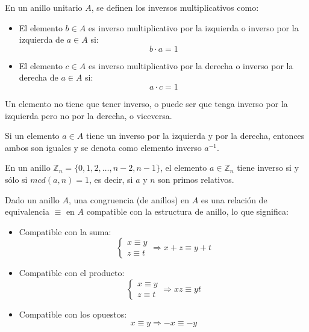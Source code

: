 \begin{definition}
En un anillo unitario $A$, se definen los inversos multiplicativos como:
\begin{itemize}
    \item El elemento $b \in A$ es inverso multiplicativo por la izquierda o inverso por la izquierda de $a \in A$ si:
    $$b \cdot a = 1$$
    \item El elemento $c \in A$ es inverso multiplicativo por la derecha o inverso por la derecha de $a \in A$ si:
    $$a \cdot c = 1$$
\end{itemize}

Un elemento no tiene que tener inverso, o puede ser que tenga inverso por la izquierda pero no por la derecha, o viceversa.

Si un elemento $a \in A$ tiene un inverso por la izquierda y por la derecha, entonces ambos son iguales y se denota como elemento inverso $a^{-1}$.

En un anillo $\mathbb{Z}_{n} = \{0, 1, 2, \dots, n-2, n-1\}$, el elemento $a \in \mathbb{Z}_{n}$ tiene inverso si y sólo si $mcd(a, n) = 1$, es decir, si $a$ y $n$ son primos relativos.
\end{definition}

\begin{definition}[Congruencia]
    Dado un anillo $A$, una congruencia (de anillos) en $A$ es una relación de equivalencia $\equiv$ en $A$ compatible con la estructura de anillo, lo que significa:
    \begin{itemize}
        \item Compatible con la suma:
        \begin{equation*}
            \begin{cases}
            x \equiv y \\
            z \equiv t
            \end{cases}
            \Rightarrow x + z \equiv y + t
        \end{equation*}
        \item Compatible con el producto:
        \begin{equation*}
            \begin{cases}
            x \equiv y \\
            z \equiv t
            \end{cases}
            \Rightarrow xz \equiv yt
        \end{equation*}
        \item Compatible con los opuestos:
        \begin{equation*}
            x \equiv y \Rightarrow -x \equiv -y
        \end{equation*}
    \end{itemize}
\end{definition}

